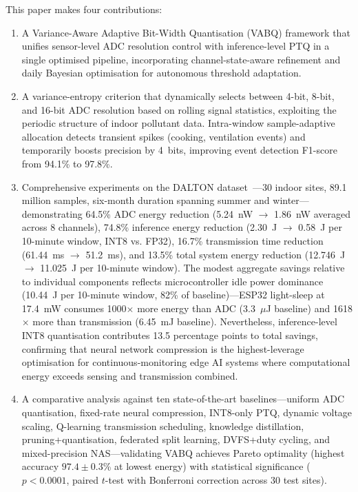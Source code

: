 This paper makes four contributions:
\begin{enumerate}[leftmargin=*]
    \item A Variance-Aware Adaptive Bit-Width Quantisation (VABQ) framework that unifies sensor-level ADC resolution control with inference-level PTQ in a single optimised pipeline, incorporating channel-state-aware refinement and daily Bayesian optimisation for autonomous threshold adaptation.
    
    \item A variance-entropy criterion that dynamically selects between 4-bit, 8-bit, and 16-bit ADC resolution based on rolling signal statistics, exploiting the periodic structure of indoor pollutant data. Intra-window sample-adaptive allocation detects transient spikes (cooking, ventilation events) and temporarily boosts precision by 4~bits, improving event detection F1-score from 94.1\% to 97.8\%.
    
    \item Comprehensive experiments on the DALTON dataset~\cite{karmakar2024exploring, karmakar2024indoor}---30 indoor sites, 89.1 million samples, six-month duration spanning summer and winter---demonstrating 64.5\% ADC energy reduction (5.24~nW $\rightarrow$ 1.86~nW averaged across 8 channels), 74.8\% inference energy reduction (2.30~J $\rightarrow$ 0.58~J per 10-minute window, INT8 vs. FP32), 16.7\% transmission time reduction (61.44~ms $\rightarrow$ 51.2~ms), and 13.5\% total system energy reduction (12.746~J $\rightarrow$ 11.025~J per 10-minute window). The modest aggregate savings relative to individual components reflects microcontroller idle power dominance (10.44~J per 10-minute window, 82\% of baseline)---ESP32 light-sleep at 17.4~mW consumes 1000$\times$ more energy than ADC (3.3~$\mu$J baseline) and 1618$\times$ more than transmission (6.45~mJ baseline). Nevertheless, inference-level INT8 quantisation contributes 13.5 percentage points to total savings, confirming that neural network compression is the highest-leverage optimisation for continuous-monitoring edge AI systems where computational energy exceeds sensing and transmission combined.
    
    \item A comparative analysis against ten state-of-the-art baselines---uniform ADC quantisation, fixed-rate neural compression, INT8-only PTQ, dynamic voltage scaling, Q-learning transmission scheduling, knowledge distillation, pruning+quantisation, federated split learning, DVFS+duty cycling, and mixed-precision NAS---validating VABQ achieves Pareto optimality (highest accuracy $97.4 \pm 0.3$\% at lowest energy) with statistical significance ($p < 0.0001$, paired $t$-test with Bonferroni correction across 30 test sites).
\end{enumerate}

